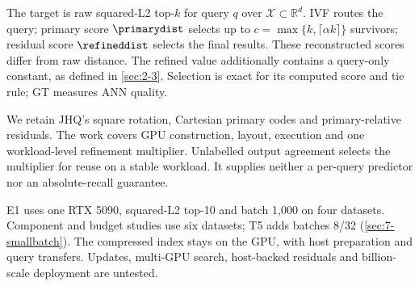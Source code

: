 The target is raw squared-L2 top-$k$ for query $q$ over $\mathcal X\subset\mathbb R^d$. IVF routes the query; primary score $\primarydist$ selects up to $c=\max\{k,\lceil\alpha k\rceil\}$ survivors; residual score $\refineddist$ selects the final results. These reconstructed scores differ from raw distance. The refined value additionally contains a query-only constant, as defined in \cref{sec:2-3}. Selection is exact for its computed score and tie rule; GT measures ANN quality.

We retain JHQ's square rotation, Cartesian primary codes and primary-relative residuals. The work covers GPU construction, layout, execution and one workload-level refinement multiplier. Unlabelled output agreement selects the multiplier for reuse on a stable workload. It supplies neither a per-query predictor nor an absolute-recall guarantee.

E1 uses one RTX 5090, squared-L2 top-10 and batch 1,000 on four datasets. Component and budget studies use six datasets; T5 adds batches 8/32 (\cref{sec:7-smallbatch}). The compressed index stays on the GPU, with host preparation and query transfers. Updates, multi-GPU search, host-backed residuals and billion-scale deployment are untested.